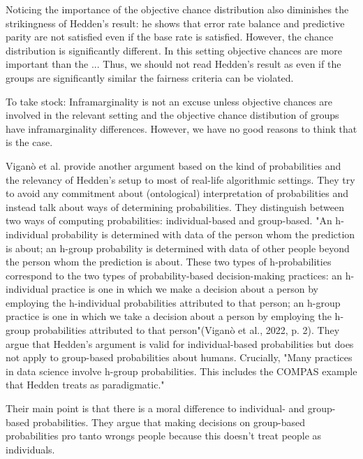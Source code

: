 \documentclass{article}
\begin{document}
Noticing the importance of the objective chance distribution also diminishes the strikingness of Hedden's result: he shows that error rate balance and predictive parity are not satisfied even if the base rate is satisfied. However, the chance distribution is significantly different. In this setting objective chances are more important than the ... Thus, we should not read Hedden's result as even if the groups are significantly similar the fairness criteria can be violated. 

To take stock: Inframarginality is not an excuse unless objective chances are involved in the relevant setting and the objective chance distibution of groups have inframarginality differences. However, we have no good reasons to think that is the case. 

Viganò et al. \citeyear{Vig2022} provide another argument based on the kind of probabilities and the relevancy of Hedden's setup to most of real-life algorithmic settings. They try to avoid any commitment about (ontological) interpretation of probabilities and instead talk about ways of determining probabilities. They distinguish between two ways of computing probabilities: individual-based and group-based. "An h-individual probability is determined with data of the person whom the prediction is about; an h-group probability is determined with data of other people beyond the person whom the prediction is about. These two types of h-probabilities correspond to the two types of probability-based decision-making practices: an h-individual practice is one in which we make a decision about a person by employing the h-individual probabilities attributed to that person; an h-group practice is one in which we take a decision about a person by employing the h-group probabilities attributed to that person"(Viganò et al., 2022, p. 2). They argue that Hedden's argument is valid for individual-based probabilities but does not apply to group-based probabilities about humans. Crucially, "Many practices in data science involve h-group probabilities. This includes the COMPAS example that Hedden treats as paradigmatic."

Their main point is that there is a moral difference to individual- and group-based probabilities. They argue that making decisions on group-based probabilities pro tanto wrongs people because this doesn't treat people as individuals. 
\end{document}
